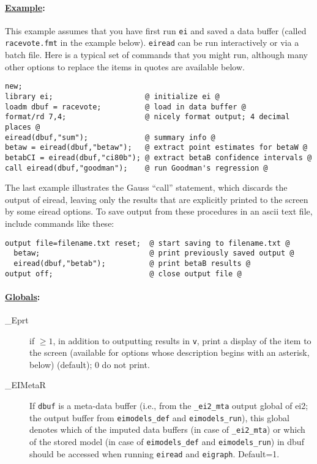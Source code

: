 \documentclass[11pt,titlepage]{article}
\begin{document}
\paragraph{\underline{Example}:}
This example assumes that you have first run \texttt{ei} and saved a
data buffer (called \texttt{racevote.fmt} in the example below).
\texttt{eiread} can be run interactively or via a batch file.  Here is
a typical set of commands that you might run, although many other
options to replace the items in quotes are available below.
\begin{verbatim}
new;
library ei;                     @ initialize ei @
loadm dbuf = racevote;          @ load in data buffer @
format/rd 7,4;                  @ nicely format output; 4 decimal places @
eiread(dbuf,"sum");             @ summary info @
betaw = eiread(dbuf,"betaw");   @ extract point estimates for betaW @
betabCI = eiread(dbuf,"ci80b"); @ extract betaB confidence intervals @
call eiread(dbuf,"goodman");    @ run Goodman's regression @
\end{verbatim}
The last example illustrates the Gauss ``call'' statement, which
discards the output of eiread, leaving only the results that are
explicitly printed to the screen by some eiread options.  To save
output from these procedures in an ascii text file, include commands
like these:
\begin{verbatim}
output file=filename.txt reset;  @ start saving to filename.txt @
  betaw;                         @ print previously saved output @
  eiread(dbuf,"betab");          @ print betaB results @
output off;                      @ close output file @
\end{verbatim}

\paragraph{\underline{Globals}:}
\begin{description}
\item[\_Eprt] if $\geq 1$, in addition to outputting results in
  \texttt{v}, print a display of the item to the screen (available for
  options whose description begins with an asterisk, below) (default);
  0 do not print.
  
\item[\_EIMetaR] If \texttt{dbuf} is a meta-data buffer (i.e., from
  the \texttt{\_ei2\_mta} output global of ei2; the output buffer from
  \texttt{eimodels\_def} and \texttt{eimodels\_run}), this global
  denotes which of the imputed data buffers (in case of
  \texttt{\_ei2\_mta}) or which of the stored model (in case of
  \texttt{eimodels\_def} and \texttt{eimodels\_run}) in dbuf should be
  accessed when running \texttt{eiread} and \texttt{eigraph}.  Default=1.
\end{description}
\end{document}
